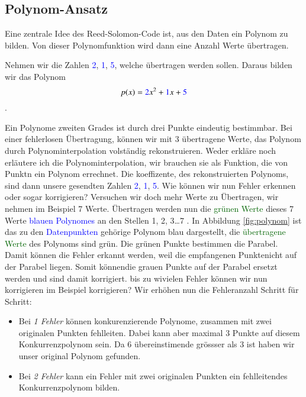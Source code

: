 \subsection{Polynom-Ansatz
\label{reedsolomon:section:polynomansatz}}
Eine zentrale Idee des Reed-Solomon-Code ist, aus den Daten ein Polynom zu bilden. 
Von dieser Polynomfunktion wird dann eine Anzahl Werte übertragen.
\begin{beispiel} Nehmen wir die Zahlen \textcolor{blue}{2}, \textcolor{blue}{1}, \textcolor{blue}{5},
    welche übertragen werden sollen. Daraus bilden wir das Polynom
\begin{equation}
p(x)
=
\textcolor{blue}{2}x^2 + \textcolor{blue}{1}x + \textcolor{blue}{5}
\label{reedsolomon:equation1}
\end{equation}.
\par 
Ein Polynome zweiten Grades ist durch drei Punkte eindeutig bestimmbar. 
Bei einer fehlerlosen Übertragung, können wir mit 3 übertragene Werte,
    das Polynom durch Polynominterpolation volständig rekonstruieren.
Weder erkläre noch erläutere ich die Polynominterpolation,
    wir brauchen sie als Funktion, die von Punktn ein Polynom errechnet.
Die koeffizente, des rekonstruierten Polynoms, sind dann unsere gesendten Zahlen \textcolor{blue}{2}, \textcolor{blue}{1}, \textcolor{blue}{5}.
Wie können wir nun Fehler erkennen oder sogar korrigieren?
Versuchen wir doch mehr Werte zu Übertragen, wir nehmen im Beispiel 7 Werte.
Übertragen werden nun die \textcolor{darkgreen}{grünen Werte} 
    dieses 7 Werte \textcolor{blue}{blauen Polynomes} an den Stellen 1, 2, 3\dots 7 .
In Abbildung \ref{fig:polynom} ist das zu den \textcolor{blue}{Datenpunkten} gehörige Polynom blau dargestellt,
die \textcolor{darkgreen}{übertragene Werte} des Polynoms sind grün.
Die grünen Punkte bestimmen die Parabel. 
Damit können die Fehler erkannt werden, weil die empfangenen Punktenicht auf der Parabel liegen.
Somit könnendie grauen Punkte auf der Parabel ersetzt werden und sind damit korrigiert.
bis zu wivielen Fehler können wir nun korrigieren im Beispiel korrigieren?
Wir erhöhen nun die Fehleranzahl Schritt für Schritt:
\begin{itemize}
    \item Bei \textit{1 Fehler} können konkurenzierende Polynome, zusammen mit zwei originalen Punkten fehlleiten.
        Dabei kann aber maximal 3 Punkte auf diesem Konkurrenzpolynom sein.
        Da 6 übereinstimende grössser als 3 ist haben wir unser original Polynom gefunden.
    \item Bei \textit{2 Fehler} kann ein Fehler mit zwei originalen Punkten ein fehlleitendes Konkurrenzpolynom bilden.

\end{itemize}
\end{beispiel}
